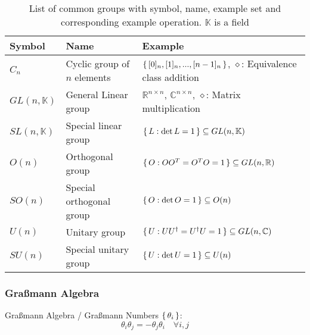 			\begin{table}[ht]
				\begin{center}
				\begin{tabular}{ l | l | l }
					Symbol & Name & Example \\ \hline
					$C_n$ & Cyclic group of $n$ elements & $\set{[0]_n, [1]_n, ..., [n-1]_n}$, $\diamond$: Equivalence class addition \\
					$GL(n, \mathbb{K})$ & General Linear group & $\mathbb{R}^{n\times n}$, $\mathbb{C}^{n\times n}$, $\diamond$: Matrix multiplication \\
					$SL(n, \mathbb{K})$ & Special linear group & $\set{L: \det L = 1} \subseteq GL(n, \mathbb{K})$ \\
					$O(n)$ & Orthogonal group & $\set{O: OO^{T}=O^{T}O=1}\subseteq GL(n, \mathbb{R})$ \\
					$SO(n)$ & Special orthogonal group& $\set{O: \det O = 1}\subseteq O(n)$\\
					$U(n)$ & Unitary group & $\set{U: UU^{\dagger}=U^{\dagger}U=1}\subseteq GL(n, \mathbb{C})$ \\
					$SU(n)$ & Special unitary group & $\set{U: \det U = 1}\subseteq U(n)$ \\
					\end{tabular}
					\caption{List of common groups with symbol, name, example set and corresponding example operation. $\mathbb{K}$ is a field}
				\end{center}
			\end{table} \vsp




		\subsubsection{Graßmann Algebra}
			\noindent
			Graßmann Algebra / Graßmann Numbers $\set{\theta_i}$:
			\begin{equation}
				\theta_i \theta_j = - \theta_j \theta_i \quad \forall i,j
			\end{equation}

